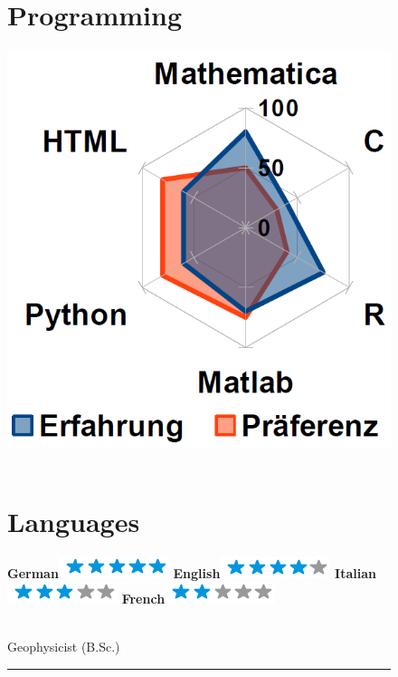 \documentclass{scrartcl}
\begin{document}
\begin{figure}[htb]
\begin{minipage}[t]{0.25\textwidth}
    \section*{\hfill \color{pblue} Programming}
	\vspace{-2mm}
	\includegraphics[scale=0.65]{img/Programming.png}
	~
	\section*{\hfill \color{pblue} Languages}
	\vspace{-2mm}
	\textbf{German}\includegraphics[scale=0.40]{img/5stars.png}
	\textbf{English}\includegraphics[scale=0.40]{img/4stars.png}
    \textbf{Italian}\includegraphics[scale=0.67]{img/3stars.png}
    \textbf{French}\includegraphics[scale=0.40]{img/2stars.png}
	\end{minipage}
	\hfill
%	
	\begin{minipage}[t]{0.72\textwidth} 
	{\fontsize{30pt}{62pt}\color{gray} }\\
    {\fontsize{14pt}{24pt}\color{pblue} \selectfont Geophysicist \color{lightgray} (B.Sc.)}\\
	\hrule
	

\end{minipage}
\end{figure}
\end{document}
